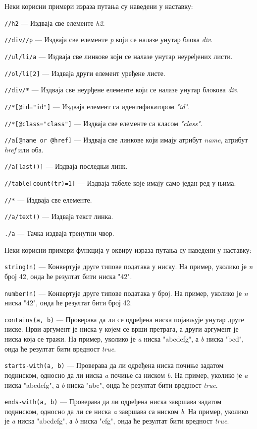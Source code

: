 \documentclass[12pt,oneside]{memoir}
\begin{document}
Неки корисни примери израза путања су наведени у наставку:
\begin{description}
\item \texttt{//h2} --- Издваја све елементе \textit{h2}.
\item \texttt{//div//p} --- Издваја све елементе \textit{p} који се налазе унутар блока \textit{div}.
\item \texttt{//ul/li/a} --- Издваја све линкове који се налазе унутар неуређених листи.
\item \texttt{//ol/li[2]} --- Издваја други елемент уређене листе.
\item \texttt{//div/*} --- Издваја све неурђене елементе који се налазе унутар блокова \textit{div}.
\item \texttt{//*[@id="id"]} --- Издваја елемент са идентификатором \textit{"id"}.
\item \texttt{//*[@class="class"]} --- Издваја све елементе са класом \textit{"class"}.
\item \texttt{//a[@name or @href]} --- Издваја све линкове који имају атрибут \textit{name}, атрибут \textit{href} или оба.
\item \texttt{//a[last()]} --- Издваја последњи линк.
\item \texttt{//table[count(tr)=1]} --- Издваја табеле које имају само један ред у њима.
\item \texttt{//*} --- Издваја све елементе.
\item \texttt{//a/text()} --- Издваја текст линка.
\item \texttt{./a} --- Тачка издваја тренутни чвор.
\end{description}

Неки корисни примери функција у оквиру израза путања су наведени у наставку:
\begin{description}
\item \texttt{string(n)} --- Конвертује друге типове података у ниску. На пример, уколико је \textit{n} број 42, онда ће резултат бити ниска "42".
\item \texttt{number(n)} --- Конвертује друге типове података у број. На пример, уколико је \textit{n} ниска "42", онда ће резултат бити број 42.
\item \texttt{contains(a, b)} --- Проверава да ли се одређена ниска појављује унутар друге ниске. Први аргумент је ниска у којем се врши претрага, а други аргумент је ниска која се тражи. На пример, уколико је \textit{a} ниска "abcdefg", а \textit{b} ниска "bcd", онда ће резултат бити вредност \textit{true}.
\item \texttt{starts-with(a, b)} --- Проверава да ли одређена ниска почиње задатом подниском, односно да ли ниска \textit{a} почиње са ниском \textit{b}.
На пример, уколико је \textit{a} ниска "abcdefg", а \textit{b} ниска "abc", онда ће резултат бити вредност \textit{true}.
\item \texttt{ends-with(a, b)} --- Проверава да ли одређена ниска завршава задатом подниском, односно да ли се ниска \textit{a} завршава са ниском \textit{b}.
На пример, уколико је \textit{a} ниска "abcdefg", а \textit{b} ниска "efg", онда ће резултат бити вредност \textit{true}.
\end{description}
\end{document}
